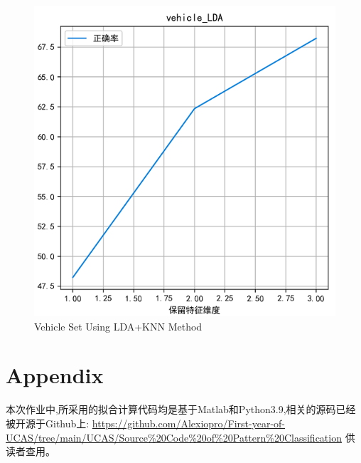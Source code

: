 \documentclass[homework]{IEEEtran}
\begin{document}
\begin{CJK}{UTF8}{gkai}
\begin{figure}[htb]
    \centerline{\includegraphics{Images/fig4.png}}
    \caption{Vehicle Set Using LDA+KNN Method}
    \label{fig4}
    \end{figure} \par

\end{CJK}

\clearpage

\section{Appendix}
\begin{CJK}{UTF8}{gkai}
    本次作业中,所采用的拟合计算代码均是基于Matlab和Python3.9,相关的源码已经被开源于Github上:
    \url{https://github.com/Alexiopro/First-year-of-UCAS/tree/main/UCAS/Source%20Code%20of%20Pattern%20Classification}
    供读者查用。 \par
\end{CJK}
\end{document}
